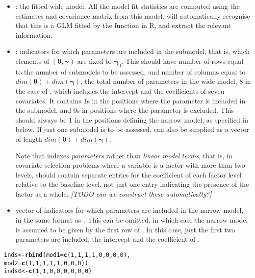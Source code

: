 \documentclass[article,shortnames,nojss,nofooter]{jss}\usepackage[]{graphicx}\usepackage[]{color}
\makeatletter
\newcommand{\hlnum}[1]{\textcolor[rgb]{0.686,0.059,0.569}{#1}}%
\newcommand{\hlstd}[1]{\textcolor[rgb]{0.345,0.345,0.345}{#1}}%
\newcommand{\hlkwb}[1]{\textcolor[rgb]{0.69,0.353,0.396}{#1}}%
\newcommand{\hlkwc}[1]{\textcolor[rgb]{0.333,0.667,0.333}{#1}}%
\newcommand{\hlkwd}[1]{\textcolor[rgb]{0.737,0.353,0.396}{\textbf{#1}}}%
\newenvironment{kframe}{%
 \def\at@end@of@kframe{}%
 \ifinner\ifhmode%
  \def\at@end@of@kframe{\end{minipage}}%
  \begin{minipage}{\columnwidth}%
 \fi\fi%
 \def\FrameCommand##1{\hskip\@totalleftmargin \hskip-\fboxsep
 \colorbox{shadecolor}{##1}\hskip-\fboxsep
     \hskip-\linewidth \hskip-\@totalleftmargin \hskip\columnwidth}%
 \MakeFramed {\advance\hsize-\width
   \@totalleftmargin\z@ \linewidth\hsize
   \@setminipage}}%
 {\par\unskip\endMakeFramed%
 \at@end@of@kframe}
\newenvironment{knitrout}{}{} %
\newcommand{\btheta}{\boldsymbol{\theta}}
\newcommand{\bgamma}{\boldsymbol{\gamma}}
\makeatother
\begin{document}
\begin{itemize}

\item {}: the fitted wide model.  All the model fit statistics are computed using the estimates and covariance matrix from this model.    will automatically recognise that this is a GLM fitted by the  function in R, and extract the relevant information. 

\item {}: indicators for which parameters are included in the submodel, that is, which elements of $(\btheta,\bgamma)$ are fixed to $\bgamma_0$.  This should have number of rows equal to the number of submodels to be assessed, and number of columns equal to $dim(\btheta) + dim(\bgamma)$, the total number of parameters in the wide model, 8 in the case of , which includes the intercept and the coefficients of seven covariates.   It contains 1s in the positions where the parameter is included in the submodel, and 0s in positions where the parameter is excluded.  This should always be 1 in the positions defining the narrow model, as specified in  below.  If just one submodel is to be assessed,  can also be supplied as a vector of length $dim(\btheta) + dim(\bgamma)$.    
  
  Note that  indexes \emph{parameters} rather than \emph{linear model terms}, that is, in covariate selection problems where a variable is a factor with more than two levels,  should contain separate entries for the coefficient of each factor level relative to the baseline level, not just one entry indicating the presence of the factor as a whole.   \emph{[TODO can we construct these automatically?]}

\item {} vector of indicators for which parameters are included in the narrow model, in the same format as .  This can be omitted, in which case the narrow model is assumed to be given by the first row of .  In this case, just the first two parameters are included, the intercept and the coefficient of .
\end{itemize}
\begin{knitrout}
\color{fgcolor}\begin{kframe}
\begin{alltt}
\hlstd{inds} \hlkwb{<-} \hlkwd{rbind}\hlstd{(}\hlkwc{mod1} \hlstd{=} \hlkwd{c}\hlstd{(}\hlnum{1}\hlstd{,}\hlnum{1}\hlstd{,}\hlnum{1}\hlstd{,}\hlnum{1}\hlstd{,}\hlnum{0}\hlstd{,}\hlnum{0}\hlstd{,}\hlnum{0}\hlstd{,}\hlnum{0}\hlstd{),}
              \hlkwc{mod2} \hlstd{=} \hlkwd{c}\hlstd{(}\hlnum{1}\hlstd{,}\hlnum{1}\hlstd{,}\hlnum{1}\hlstd{,}\hlnum{1}\hlstd{,}\hlnum{1}\hlstd{,}\hlnum{0}\hlstd{,}\hlnum{0}\hlstd{,}\hlnum{0}\hlstd{))}
\hlstd{inds0} \hlkwb{<-} \hlkwd{c}\hlstd{(}\hlnum{1}\hlstd{,}\hlnum{1}\hlstd{,}\hlnum{0}\hlstd{,}\hlnum{0}\hlstd{,}\hlnum{0}\hlstd{,}\hlnum{0}\hlstd{,}\hlnum{0}\hlstd{,}\hlnum{0}\hlstd{)}
\end{alltt}
\end{kframe}
\end{knitrout}
\end{document}
